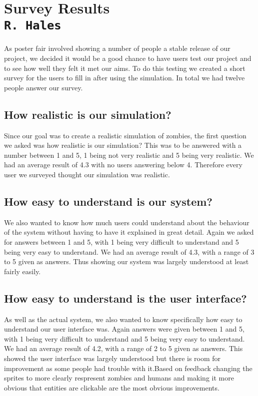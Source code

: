 \pagestyle{empty}
\section{Survey Results\\{\small\tt{R.~Hales}}}

As poster fair involved showing a number of people a stable release of our project, we decided it would be a good chance to have users test our project and to see how well they felt it met our aims. To do this testing we created a short survey for the users to fill in after using the simulation.  In total we had twelve people answer our survey.

\subsection{How realistic is our simulation?}

Since our goal was to create a realistic simulation of zombies, the first question we asked was how realistic is our simulation? This was to be answered with a number between 1 and 5, 1 being not very realistic and 5 being very realistic. We had an average result of 4.3 with no users answering below 4. Therefore every user we surveyed thought our simulation was realistic.

\subsection{How easy to understand is our system?}

We also wanted to know how much users could understand about the behaviour of the system without having to have it explained in great detail. Again we asked for answers between 1 and 5, with 1 being very difficult to understand and 5 being very easy to understand. We had an average result of 4.3, with a range of 3 to 5 given as answers. Thus showing our system was largely understood at least fairly easily.

\subsection{How easy to understand is the user interface?}

As well as the actual system, we also wanted to know specifically how easy to understand our user interface was. Again answers were given between 1 and 5, with 1 being very difficult to understand and 5 being very easy to understand. We had an average result of 4.2, with a range of 2 to 5 given as answers. This showed the user interface was largely understood but there is room for improvement as some people had trouble with it.Based on feedback changing the sprites to more clearly respresent zombies and humans and making it more obvious that entities are clickable are the most obvious improvements.

